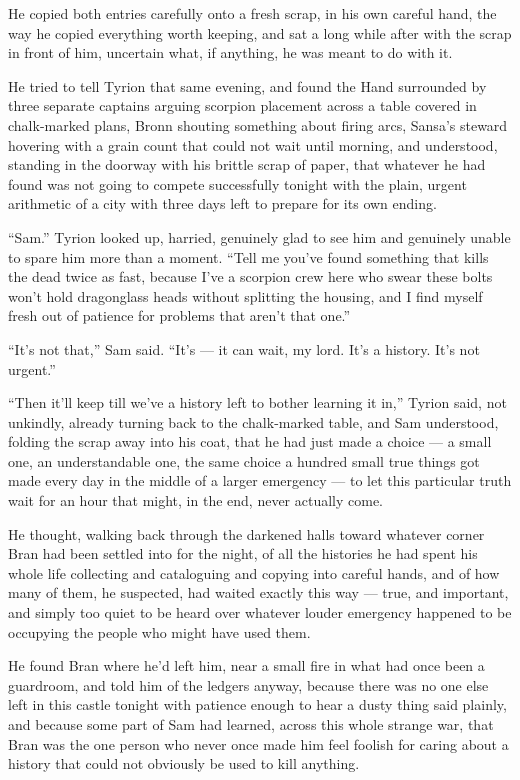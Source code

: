 He copied both entries carefully onto a fresh scrap, in his own careful hand, the way he copied everything worth keeping, and sat a long while after with the scrap in front of him, uncertain what, if anything, he was meant to do with it.

\sceneBreak

He tried to tell Tyrion that same evening, and found the Hand surrounded by three separate captains arguing scorpion placement across a table covered in chalk-marked plans, Bronn shouting something about firing arcs, Sansa’s steward hovering with a grain count that could not wait until morning, and understood, standing in the doorway with his brittle scrap of paper, that whatever he had found was not going to compete successfully tonight with the plain, urgent arithmetic of a city with three days left to prepare for its own ending.

“Sam.” Tyrion looked up, harried, genuinely glad to see him and genuinely unable to spare him more than a moment. “Tell me you’ve found something that kills the dead twice as fast, because I’ve a scorpion crew here who swear these bolts won’t hold dragonglass heads without splitting the housing, and I find myself fresh out of patience for problems that aren’t that one.”

“It’s not that,” Sam said. “It’s — it can wait, my lord. It’s a history. It’s not urgent.”

“Then it’ll keep till we’ve a history left to bother learning it in,” Tyrion said, not unkindly, already turning back to the chalk-marked table, and Sam understood, folding the scrap away into his coat, that he had just made a choice — a small one, an understandable one, the same choice a hundred small true things got made every day in the middle of a larger emergency — to let this particular truth wait for an hour that might, in the end, never actually come.

He thought, walking back through the darkened halls toward whatever corner Bran had been settled into for the night, of all the histories he had spent his whole life collecting and cataloguing and copying into careful hands, and of how many of them, he suspected, had waited exactly this way — true, and important, and simply too quiet to be heard over whatever louder emergency happened to be occupying the people who might have used them.

\sceneBreak

He found Bran where he’d left him, near a small fire in what had once been a guardroom, and told him of the ledgers anyway, because there was no one else left in this castle tonight with patience enough to hear a dusty thing said plainly, and because some part of Sam had learned, across this whole strange war, that Bran was the one person who never once made him feel foolish for caring about a history that could not obviously be used to kill anything.

